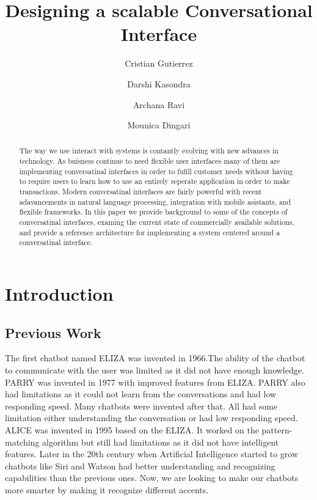 \documentclass[9pt,software]{livecoms}
\title{Designing a scalable Conversational Interface}
\author[1\authfn{3}]{Cristian Gutierrez}
\author[1\authfn{3}]{Darshi Kasondra}
\author[1\authfn{3}]{Archana Ravi}
\author[1\authfn{3}]{Mounica Dingari}
\affil[1]{California State University of Northridge}
\begin{document}
\begin{frontmatter}
  \maketitle
  
  \begin{abstract}
    The way we use interact with systems is contantly evolving with new advances in technology. As buisness continue to need flexible user
    interfaces many of them are implementing conversatinal interfaces in order to fufill customer needs without having to require users
    to learn how to use an entirely seperate application in order to make transactions. Modern conversatinal interfaces are fairly powerful 
    with recent adavancements in natural language processing, integration with mobile asistants, and flexible frameworks. In this paper we 
    provide background to some of the concepts of conversatinal interfaces, examing the current state of commercially available
    solutions, and provide a reference architecture for implementing a system centered around a conversatinal interface.
  \end{abstract}
  
\end{frontmatter}

\section{Introduction}

\subsection{Previous Work}
The first chatbot named ELIZA was invented in 1966.The ability of the chatbot to communicate with the user was limited as it did not have enough knowledge. PARRY was invented in 1977 with improved features from ELIZA. PARRY also had limitations as it could not learn from the conversations and had low responding speed. Many chatbots were invented after that. All had some limitation either understanding the conversation or had low responding speed. ALICE was invented in 1995 based on the ELIZA. It worked on the pattern-matching algorithm but still had limitations as it did not have intelligent features. Later in the 20th century when Artificial Intelligence started to grow chatbots like Siri and Watson had better understanding and recognizing capabilities than the previous ones. Now, we are looking to make our chatbots more smarter by making it recognize different accents.
\end{document}
